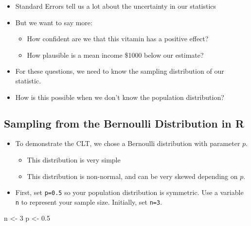 \documentclass[
]{book}
\newenvironment{Shaded}{\begin{snugshade}}{\end{snugshade}}
\newcommand{\DecValTok}[1]{\textcolor[rgb]{0.00,0.00,0.81}{#1}}
\newcommand{\FloatTok}[1]{\textcolor[rgb]{0.00,0.00,0.81}{#1}}
\newcommand{\NormalTok}[1]{#1}
\newcommand{\OtherTok}[1]{\textcolor[rgb]{0.56,0.35,0.01}{#1}}
\providecommand{\tightlist}{%
  \setlength{\itemsep}{0pt}\setlength{\parskip}{0pt}}
\theoremstyle{definition}
\theoremstyle{definition}
\theoremstyle{definition}
\theoremstyle{definition}
\theoremstyle{remark}
\begin{document}
\begin{itemize}
\tightlist
\item
  Standard Errors tell us a lot about the uncertainty in our statistics
\item
  But we want to say more:

  \begin{itemize}
  \tightlist
  \item
    How confident are we that this vitamin has a positive effect?
  \item
    How plausible is a mean income \$1000 below our estimate?
  \end{itemize}
\item
  For these questions, we need to know the sampling distribution of our statistic.
\item
  How is this possible when we don't know the population distribution?
\end{itemize}

\hypertarget{sampling-from-the-bernoulli-distribution-in-r}{%
\subsection{Sampling from the Bernoulli Distribution in R}\label{sampling-from-the-bernoulli-distribution-in-r}}

\begin{itemize}
\tightlist
\item
  To demonstrate the CLT, we chose a Bernoulli distribution with parameter \(p\).

  \begin{itemize}
  \tightlist
  \item
    This distribution is very simple
  \item
    This distribution is non-normal, and can be very skewed depending on \(p\).
  \end{itemize}
\item
  First, set \texttt{p=0.5} so your population distribution is symmetric. Use a variable \texttt{n} to represent your sample size. Initially, set \texttt{n=3}.
\end{itemize}

\begin{Shaded}
\begin{Highlighting}[]
\NormalTok{n }\OtherTok{\textless{}{-}} \DecValTok{3}
\NormalTok{p }\OtherTok{\textless{}{-}} \FloatTok{0.5}
\end{Highlighting}
\end{Shaded}
\end{document}
